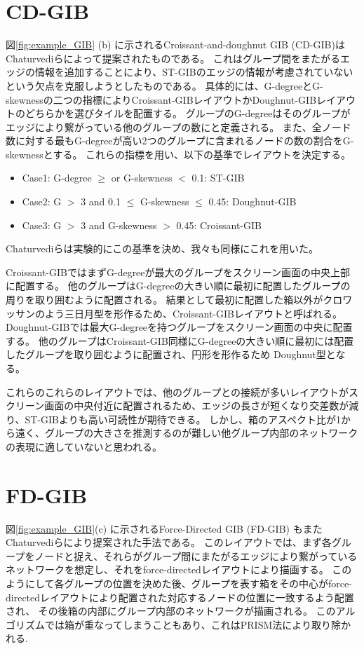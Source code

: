 \documentclass{kuee}
\begin{document}
\section{CD-GIB}
図\ref{fig:example_GIB} (b) に示されるCroissant-and-doughnut GIB (CD-GIB)はChaturvediらによって提案された\cite{chaturvedi2014group}ものである。
これはグループ間をまたがるエッジの情報を追加することにより、ST-GIBのエッジの情報が考慮されていないという欠点を克服しようとしたものである。
具体的には、G-degreeとG-skewnessの二つの指標によりCroissant-GIBレイアウトかDoughnut-GIBレイアウトのどちらかを選びタイルを配置する。
グループのG-degreeはそのグループがエッジにより繋がっている他のグループの数にと定義される。
また、全ノード数に対する最もG-degreeが高い2つのグループに含まれるノードの数の割合をG-skewnessとする。
これらの指標を用い、以下の基準でレイアウトを決定する。
\begin{itemize}
  \item Case1: G-degree $\ge$ or G-skewness $<$ 0.1: ST-GIB
  \item Case2: G $>$ 3 and 0.1 $\le$ G-skewness $\le$ 0.45: Doughnut-GIB
  \item Case3: G $>$ 3 and G-skewness $>$ 0.45: Croissant-GIB
\end{itemize}
Chaturvediらは実験的にこの基準を決め、我々も同様にこれを用いた。

Croissant-GIBではまずG-degreeが最大のグループをスクリーン画面の中央上部に配置する。
他のグループはG-degreeの大きい順に最初に配置したグループの周りを取り囲むように配置される。
結果として最初に配置した箱以外がクロワッサンのよう三日月型を形作るため、Croissant-GIBレイアウトと呼ばれる。
Doughnut-GIBでは最大G-degreeを持つグループをスクリーン画面の中央に配置する。
他のグループはCroissant-GIB同様にG-degreeの大きい順に最初には配置したグループを取り囲むように配置され、円形を形作るため
Doughnut型となる。

これらのこれらのレイアウトでは、他のグループとの接続が多いレイアウトがスクリーン画面の中央付近に配置されるため、エッジの長さが短くなり交差数が減り、ST-GIBよりも高い可読性が期待できる。
しかし、箱のアスペクト比が1から遠く、グループの大きさを推測するのが難しい他グループ内部のネットワークの表現に適していないと思われる。

\section{FD-GIB}
図\ref{fig:example_GIB}(c) に示されるForce-Directed GIB (FD-GIB) もまたChaturvediらにより提案された手法である。
このレイアウトでは、まず各グループをノードと捉え、それらがグループ間にまたがるエッジにより繋がっているネットワークを想定し、それをforce-directedレイアウトにより描画する。
このようにして各グループの位置を決めた後、グループを表す箱をその中心がforce-directedレイアウトにより配置された対応するノードの位置に一致するよう配置され、
その後箱の内部にグループ内部のネットワークが描画される。
このアルゴリズムでは箱が重なってしまうこともあり、これはPRISM法により取り除かれる\cite{gansner2008efficient}.
\end{document}
